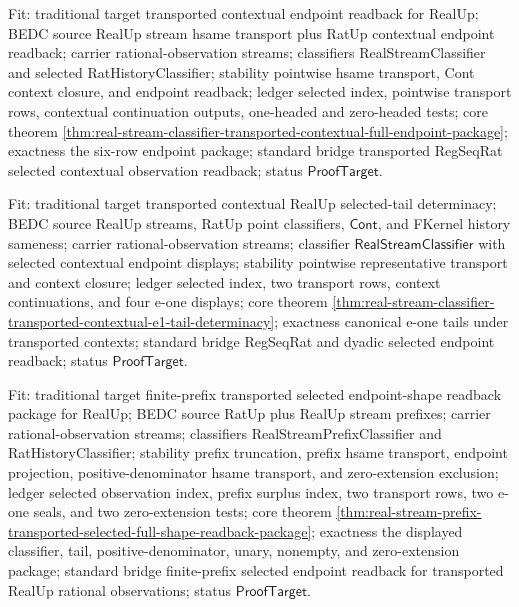 Fit: traditional target transported contextual endpoint readback for RealUp;
BEDC source RealUp stream hsame transport plus RatUp contextual endpoint
readback; carrier rational-observation streams; classifiers RealStreamClassifier
and selected RatHistoryClassifier; stability pointwise hsame transport, Cont
context closure, and endpoint readback; ledger selected index, pointwise
transport rows, contextual continuation outputs, one-headed and zero-headed
tests; core theorem
\autoref{thm:real-stream-classifier-transported-contextual-full-endpoint-package};
exactness the six-row endpoint package; standard bridge transported RegSeqRat
selected contextual observation readback; status $\mathsf{ProofTarget}$.

Fit: traditional target transported contextual RealUp selected-tail
determinacy; BEDC source RealUp streams, RatUp point classifiers,
$\mathsf{Cont}$, and FKernel history sameness; carrier rational-observation
streams; classifier $\mathsf{RealStreamClassifier}$ with selected contextual
endpoint displays; stability pointwise representative transport and context
closure; ledger selected index, two transport rows, context continuations, and
four e-one displays; core theorem
\autoref{thm:real-stream-classifier-transported-contextual-e1-tail-determinacy};
exactness canonical e-one tails under transported contexts; standard bridge
RegSeqRat and dyadic selected endpoint readback; status
$\mathsf{ProofTarget}$.

Fit: traditional target finite-prefix transported selected endpoint-shape
readback package for RealUp; BEDC source RatUp plus RealUp stream prefixes;
carrier rational-observation streams; classifiers RealStreamPrefixClassifier
and RatHistoryClassifier; stability prefix truncation, prefix hsame transport,
endpoint projection, positive-denominator hsame transport, and zero-extension
exclusion; ledger selected observation index, prefix surplus index, two
transport rows, two e-one seals, and two zero-extension tests; core theorem
\autoref{thm:real-stream-prefix-transported-selected-full-shape-readback-package};
exactness the displayed classifier, tail, positive-denominator, unary, nonempty,
and zero-extension package; standard bridge finite-prefix selected endpoint
readback for transported RealUp rational observations; status
$\mathsf{ProofTarget}$.

